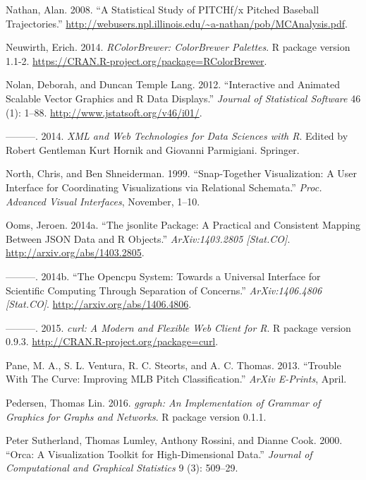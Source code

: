 \documentclass[12pt,]{isuthesis}
\begin{document}
\hypertarget{ref-trajecoryAnalysis}{}
Nathan, Alan. 2008. ``A Statistical Study of PITCHf/x Pitched Baseball
Trajectories.''
\url{http://webusers.npl.illinois.edu/~a-nathan/pob/MCAnalysis.pdf}.

\hypertarget{ref-RColorBrewer}{}
Neuwirth, Erich. 2014. \emph{RColorBrewer: ColorBrewer Palettes}. R
package version 1.1-2.
\url{https://CRAN.R-project.org/package=RColorBrewer}.

\hypertarget{ref-SVGAnnotation}{}
Nolan, Deborah, and Duncan Temple Lang. 2012. ``Interactive and Animated
Scalable Vector Graphics and R Data Displays.'' \emph{Journal of
Statistical Software} 46 (1): 1--88.
\url{http://www.jstatsoft.org/v46/i01/}.

\hypertarget{ref-nolan-lang}{}
---------. 2014. \emph{XML and Web Technologies for Data Sciences with
R}. Edited by Robert Gentleman Kurt Hornik and Giovanni Parmigiani.
Springer.

\hypertarget{ref-North:1999vi}{}
North, Chris, and Ben Shneiderman. 1999. ``Snap-Together Visualization:
A User Interface for Coordinating Visualizations via Relational
Schemata.'' \emph{Proc. Advanced Visual Interfaces}, November, 1--10.

\hypertarget{ref-jsonlite}{}
Ooms, Jeroen. 2014a. ``The jsonlite Package: A Practical and Consistent
Mapping Between JSON Data and R Objects.'' \emph{ArXiv:1403.2805
{[}Stat.CO{]}}. \url{http://arxiv.org/abs/1403.2805}.

\hypertarget{ref-opencpu}{}
---------. 2014b. ``The Opencpu System: Towards a Universal Interface
for Scientific Computing Through Separation of Concerns.''
\emph{ArXiv:1406.4806 {[}Stat.CO{]}}.
\url{http://arxiv.org/abs/1406.4806}.

\hypertarget{ref-curl}{}
---------. 2015. \emph{curl: A Modern and Flexible Web Client for R}. R
package version 0.9.3. \url{http://CRAN.R-project.org/package=curl}.

\hypertarget{ref-curve}{}
Pane, M. A., S. L. Ventura, R. C. Steorts, and A. C. Thomas. 2013.
``Trouble With The Curve: Improving MLB Pitch Classification.''
\emph{ArXiv E-Prints}, April.

\hypertarget{ref-ggraph}{}
Pedersen, Thomas Lin. 2016. \emph{ggraph: An Implementation of Grammar
of Graphics for Graphs and Networks}. R package version 0.1.1.

\hypertarget{ref-orca}{}
Peter Sutherland, Thomas Lumley, Anthony Rossini, and Dianne Cook. 2000.
``Orca: A Visualization Toolkit for High-Dimensional Data.''
\emph{Journal of Computational and Graphical Statistics} 9 (3): 509--29.
\end{document}
